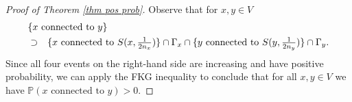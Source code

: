 \documentclass[11pt,a4paper]{article}
\newcommand{\IP}{\ensuremath{\mathbb{P}}}
\theoremstyle{remark}
\begin{document}
\begin{proof}[Proof of Theorem \ref{thm pos prob}]
Observe that for $x,y \in V$
\begin{eqnarray*}
\lefteqn{ \{ x \mbox{ connected to } y \} } \\
&\supset& \{ x \mbox{ connected to } S(x,\textstyle{\frac{1}{2n_x}}) \} \cap \Gamma_x \cap \{ y \mbox{ connected to } S(y,\textstyle{\frac{1}{2n_y}}) \} \cap \Gamma_y.
\end{eqnarray*}
 Since all four events on the right-hand side are increasing and have positive probability, we can apply the FKG inequality to conclude that for all $x,y\in V$ we have $\IP(x \mbox{ connected to } y) > 0$.
\end{proof}






\end{document}
